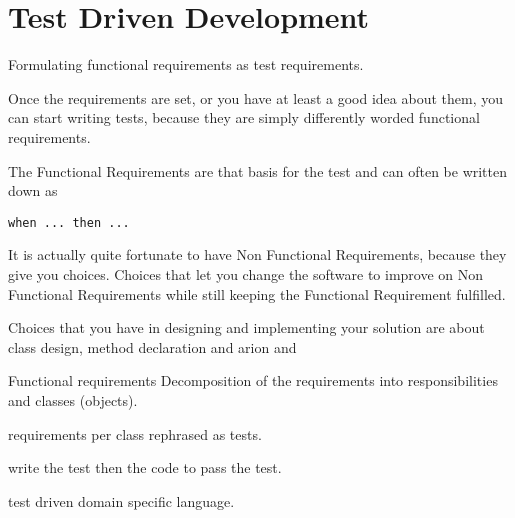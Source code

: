 \documentclass[\docroot/main]{subfiles}
\begin{document}
\section{Test Driven Development}

Formulating functional requirements as test requirements.

Once the requirements are set, or you have at least a good idea about
them, you can start writing tests, because they are simply differently
worded functional requirements.



The Functional Requirements are that basis for the test and can often
be written down as
\begin{verbatim}
when ... then ...
\end{verbatim}

It is actually quite fortunate to have Non Functional Requirements,
because they give you choices. Choices that let you change the
software to improve on Non Functional Requirements while still keeping
the Functional Requirement fulfilled.

Choices that you have in designing and implementing your solution are
about class design, method declaration and arion and 


Functional requirements
Decomposition  of the requirements into responsibilities and classes (objects).

requirements per class rephrased as tests.

write the test then the code to pass the test.

test driven domain specific language.
\end{document}
